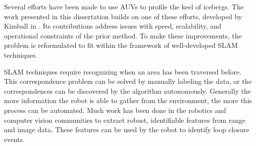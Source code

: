 Several efforts have been made to use AUVs to profile the keel of icebergs. The work presented in this dissertation builds on one of these efforts, developed by Kimball in \cite{Kimball2011b}. Its contributions address issues with speed, scalability, and operational constraints of the prior method. To make these improvements, the problem is reformulated to fit within the framework of well-developed SLAM techniques. 

SLAM techniques require recognizing when an area has been traversed before. This correspondence problem can be solved by manually labeling the data, or the correspondences can be discovered by the algorithm autonomously. Generally the more information the robot is able to gather from the environment, the more this process can be automated. Much work has been done in the robotics and computer vision communities to extract robust, identifiable features from range and image data. These features can be used by the robot to identify loop closure events.

